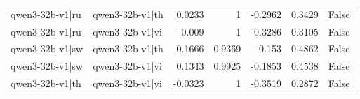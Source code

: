 \begin{table}
\begin{tabular}{l l r r r r l}
qwen3-32b-v1|ru & qwen3-32b-v1|th & 0.0233 & 1 & -0.2962 & 0.3429 & False \\
qwen3-32b-v1|ru & qwen3-32b-v1|vi & -0.009 & 1 & -0.3286 & 0.3105 & False \\
qwen3-32b-v1|sw & qwen3-32b-v1|th & 0.1666 & 0.9369 & -0.153 & 0.4862 & False \\
qwen3-32b-v1|sw & qwen3-32b-v1|vi & 0.1343 & 0.9925 & -0.1853 & 0.4538 & False \\
qwen3-32b-v1|th & qwen3-32b-v1|vi & -0.0323 & 1 & -0.3519 & 0.2872 & False \\
\bottomrule
\end{tabular}
\end{table}
